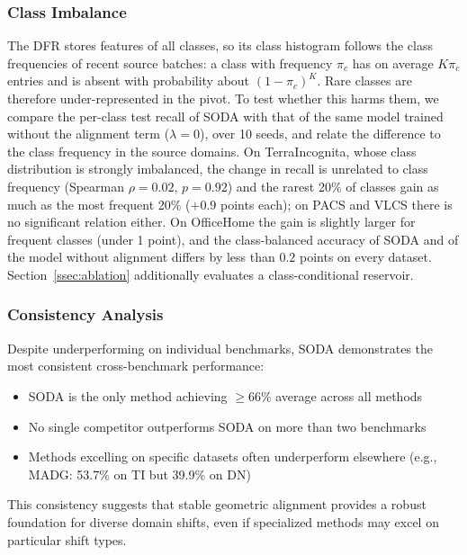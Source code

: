 \documentclass[preprint,12pt]{elsarticle}
\providecommand{\DIFadd}[1]{{\protect\color{blue} \sf #1}} %
\providecommand{\DIFaddbegin}{} %
\providecommand{\DIFaddend}{} %
\newcommand{\DIFaddincludegraphics}[2][]{{\color{blue}\fbox{\DIFOincludegraphics[#1]{#2}}}} %
\DeclareRobustCommand{\DIFaddbegin}{\DIFOaddbegin \let\includegraphics\DIFaddincludegraphics} %
\DeclareRobustCommand{\DIFaddend}{\DIFOaddend \let\includegraphics\DIFOincludegraphics} %
\begin{document}
\DIFaddbegin \subsubsection{\DIFadd{Class Imbalance}}

\DIFadd{The DFR stores features of all classes, so its class histogram follows the class frequencies of recent source batches: a class with frequency $\pi_c$ has on average $K\pi_c$ entries and is absent with probability about $(1-\pi_c)^K$. Rare classes are therefore under-represented in the pivot. To test whether this harms them, we compare the per-class test recall of SODA with that of the same model trained without the alignment term ($\lambda=0$), over 10 seeds, and relate the difference to the class frequency in the source domains. On TerraIncognita, whose class distribution is strongly imbalanced, the change in recall is unrelated to class frequency (Spearman $\rho=0.02$, $p=0.92$) and the rarest 20\% of classes gain as much as the most frequent 20\% ($+0.9$ points each); on PACS and VLCS there is no significant relation either. On OfficeHome the gain is slightly larger for frequent classes (under 1 point), and the class-balanced accuracy of SODA and of the model without alignment differs by less than $0.2$ points on every dataset. Section~\ref{ssec:ablation} additionally evaluates a class-conditional reservoir.
}

\DIFaddend \subsubsection{Consistency Analysis}

Despite underperforming on individual benchmarks, SODA demonstrates the most consistent cross-benchmark performance:

\begin{itemize}
    \item SODA is the only method achieving $\geq 66\%$ average across all methods
    \item No single competitor outperforms SODA on more than two benchmarks
    \item Methods excelling on specific datasets often underperform elsewhere (e.g., MADG: 53.7\% on TI but 39.9\% on DN)
\end{itemize}

This consistency suggests that stable geometric alignment provides a robust foundation for diverse domain shifts, even if specialized methods may excel on particular shift types.
\end{document}
